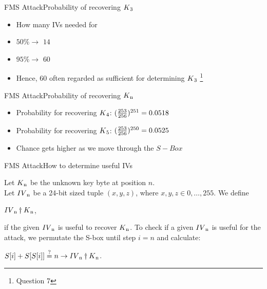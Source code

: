 \documentclass[
	aspectratio=169,	%
	onlytextwidth,		%
	t					%
	]{beamer}
\begin{document}
\begin{frame}[fragile]{FMS Attack}{Probability of recovering $K\textsubscript{3}$}
	\begin{itemize}
		\item How many IVs needed for 
		\item $50\% \rightarrow$ $14$
		\item $95\% \rightarrow$ $60$
		\item Hence, $60$ often regarded as sufficient for determining $K\textsubscript{3}$ \footnote[frame]{\footnotesize Question 7}
	\end{itemize}
\end{frame}

\begin{frame}[fragile]{FMS Attack}{Probability of recovering $K\textsubscript{n}$}
	\begin{itemize}
		\item Probability for recovering $K\textsubscript{4}$: $(\frac{253}{256})\textsuperscript{251} = 0.0518$
		\item Probability for recovering $K\textsubscript{5}$: $(\frac{253}{256})\textsuperscript{250} = 0.0525$
		\item Chance gets higher as we move through the $S-Box$
	\end{itemize}
\end{frame}

\begin{frame}[fragile]{FMS Attack}{How to determine useful IVs}
	\begin{definition}
		Let $K\textsubscript{n}$ be the unknown key byte at position $n$. \\
		Let $IV\textsubscript{n}$ be a 24-bit sized tuple $(x,y,z)$, where $x,y,z \in {0,\dots, 255}.$ We define\\
		\begin{center}$IV\textsubscript{n} \dagger K\textsubscript{n}$,
		\end{center}
		if the given $IV\textsubscript{n}$ is useful to recover $K\textsubscript{n}$.
		To check if a given $IV\textsubscript{n}$ is useful for the attack, we permutate the S-box until step $i=n$ and calculate:
		\begin{center}$S[i] + S[S[i]] \stackrel{?}{=} n \rightarrow IV\textsubscript{n} \dagger K\textsubscript{n}$.
		\end{center}
	\end{definition} 
\end{frame}
\end{document}
